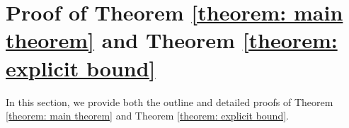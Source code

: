 \documentclass{article} \usepackage{iclr2023/iclr2023_conference,times}
\begin{document}
 \section{Proof of Theorem \ref{theorem: main theorem} and Theorem \ref{theorem: explicit bound}}
\begin{table}
    \centering
    \def\arraystretch{2.2}
    \caption{The problem parameters and the additional parameters that we introduce for our proofs. Here , , and  are some absolute constants independent of the problem parameters.}
    \label{tab: key parameters in the proofs}
\end{table}



In this section, we provide both the outline and detailed proofs of Theorem \ref{theorem: main theorem} and Theorem \ref{theorem: explicit bound}. 
\end{document}
